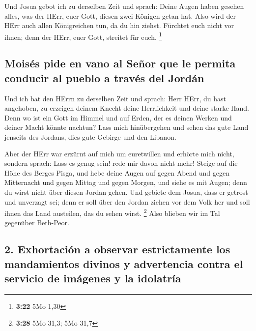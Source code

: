  Und Josua gebot ich zu derselben Zeit und sprach: Deine
Augen haben gesehen alles, was der HErr, euer Gott, diesen zwei Königen
getan hat. Also wird der HErr auch allen Königreichen tun, da du hin
ziehst.  Fürchtet euch nicht vor ihnen; denn der HErr,
euer Gott, streitet für euch. \footnote{\textbf{3:22} 5Mo 1,30}

\hypertarget{moisuxe9s-pide-en-vano-al-seuxf1or-que-le-permita-conducir-al-pueblo-a-travuxe9s-del-jorduxe1n}{%
\subsection{Moisés pide en vano al Señor que le permita conducir al
pueblo a través del
Jordán}\label{moisuxe9s-pide-en-vano-al-seuxf1or-que-le-permita-conducir-al-pueblo-a-travuxe9s-del-jorduxe1n}}

 Und ich bat den HErrn zu derselben Zeit und sprach:
 Herr HErr, du hast angehoben, zu erzeigen deinem Knecht
deine Herrlichkeit und deine starke Hand. Denn wo ist ein Gott im Himmel
und auf Erden, der es deinen Werken und deiner Macht könnte nachtun?
 Lass mich hinübergehen und sehen das gute Land jenseits
des Jordans, dies gute Gebirge und den Libanon.

 Aber der HErr war erzürnt auf mich um euretwillen und
erhörte mich nicht, sondern sprach: Lass es genug sein! rede mir davon
nicht mehr!  Steige auf die Höhe des Berges Pisga, und
hebe deine Augen auf gegen Abend und gegen Mitternacht und gegen Mittag
und gegen Morgen, und siehe es mit Augen; denn du wirst nicht über
diesen Jordan gehen.  Und gebiete dem Josua, dass er
getrost und unverzagt sei; denn er soll über den Jordan ziehen vor dem
Volk her und soll ihnen das Land austeilen, das du sehen wirst.
\footnote{\textbf{3:28} 5Mo 31,3; 5Mo 31,7}  Also blieben
wir im Tal gegenüber Beth-Peor.

\hypertarget{exhortaciuxf3n-a-observar-estrictamente-los-mandamientos-divinos-y-advertencia-contra-el-servicio-de-imuxe1genes-y-la-idolatruxeda}{%
\subsection{2. Exhortación a observar estrictamente los mandamientos
divinos y advertencia contra el servicio de imágenes y la
idolatría}\label{exhortaciuxf3n-a-observar-estrictamente-los-mandamientos-divinos-y-advertencia-contra-el-servicio-de-imuxe1genes-y-la-idolatruxeda}}

